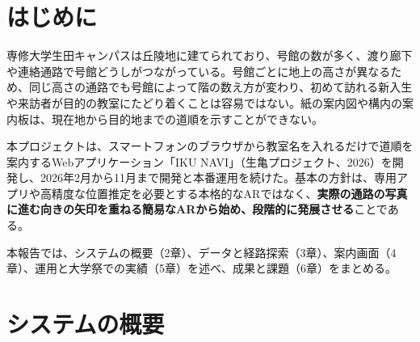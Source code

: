 \documentclass[
  paper=a4paper,
  fontsize=10.5pt,
  jafontsize=10.5pt,
  twocolumn,
  line_length=82.5mm,   %
  column_gap=5mm,
  gutter=20mm,          %
  number_of_lines=35,   %
  head_space=25mm,      %
  baselineskip=20.36pt, %
]{jlreq}
\begin{document}

\section{はじめに}

専修大学生田キャンパスは丘陵地に建てられており、号館の数が多く、渡り廊下や連絡通路で号館どうしがつながっている。号館ごとに地上の高さが異なるため、同じ高さの通路でも号館によって階の数え方が変わり、初めて訪れる新入生や来訪者が目的の教室にたどり着くことは容易ではない。紙の案内図や構内の案内板は、現在地から目的地までの道順を示すことができない。

本プロジェクトは、スマートフォンのブラウザから教室名を入れるだけで道順を案内するWebアプリケーション「IKU NAVI」（生亀プロジェクト、2026）を開発し、2026年2月から11月まで開発と本番運用を続けた。基本の方針は、専用アプリや高精度な位置推定を必要とする本格的なARではなく、\textbf{実際の通路の写真に進む向きの矢印を重ねる簡易なARから始め、段階的に発展させる}ことである。

本報告では、システムの概要（2章）、データと経路探索（3章）、案内画面（4章）、運用と大学祭での実績（5章）を述べ、成果と課題（6章）をまとめる。

\section{システムの概要}
\end{document}
